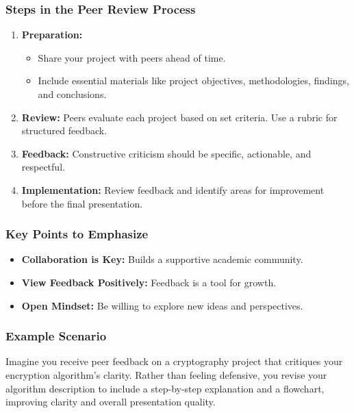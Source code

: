 \documentclass{beamer}
\begin{document}
\begin{frame}[fragile]
    \frametitle{Steps in the Peer Review Process}
    \begin{enumerate}
        \item \textbf{Preparation:}
        \begin{itemize}
            \item Share your project with peers ahead of time.
            \item Include essential materials like project objectives, methodologies, findings, and conclusions.
        \end{itemize}

        \item \textbf{Review:} 
        Peers evaluate each project based on set criteria. Use a rubric for structured feedback.
        
        \item \textbf{Feedback:} Constructive criticism should be specific, actionable, and respectful. 

        \item \textbf{Implementation:} 
        Review feedback and identify areas for improvement before the final presentation.
    \end{enumerate}
\end{frame}

\begin{frame}[fragile]
    \frametitle{Key Points to Emphasize}
    \begin{itemize}
        \item \textbf{Collaboration is Key:} 
        Builds a supportive academic community.
        
        \item \textbf{View Feedback Positively:} 
        Feedback is a tool for growth.

        \item \textbf{Open Mindset:} 
        Be willing to explore new ideas and perspectives.
    \end{itemize}
\end{frame}

\begin{frame}[fragile]
    \frametitle{Example Scenario}
    Imagine you receive peer feedback on a cryptography project that critiques your encryption algorithm's clarity. Rather than feeling defensive, you revise your algorithm description to include a step-by-step explanation and a flowchart, improving clarity and overall presentation quality.
\end{frame}
\end{document}
